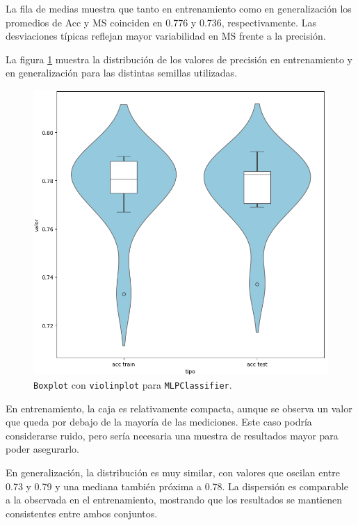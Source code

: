 La fila de medias muestra que tanto en entrenamiento como en generalización los promedios de Acc y MS coinciden en 0.776 y 0.736, respectivamente. Las desviaciones típicas reflejan mayor variabilidad en MS frente a la precisión.

\vspace{1em}

La figura \ref{fig:mlp_bin} muestra la distribución de los valores de precisión en entrenamiento y en generalización para las distintas semillas utilizadas.

\begin{figure}[H]
	\centering
	\includegraphics[width=1\linewidth]{Imagenes/mlp_bin}
	\caption[\texttt{Boxplot} con \texttt{violinplot} para \texttt{MLPClassifier}]{\texttt{Boxplot} con \texttt{violinplot} para \texttt{MLPClassifier}.}
	\label{fig:mlp_bin}
\end{figure}

En entrenamiento, la caja es relativamente compacta, aunque se observa un valor que queda por debajo de la mayoría de las mediciones. Este caso podría considerarse ruido, pero sería necesaria una muestra de resultados mayor para poder asegurarlo.

\vspace{1em}

En generalización, la distribución es muy similar, con valores que oscilan entre 0.73 y 0.79 y una mediana también próxima a 0.78. La dispersión es comparable a la observada en el entrenamiento, mostrando que los resultados se mantienen consistentes entre ambos conjuntos.

